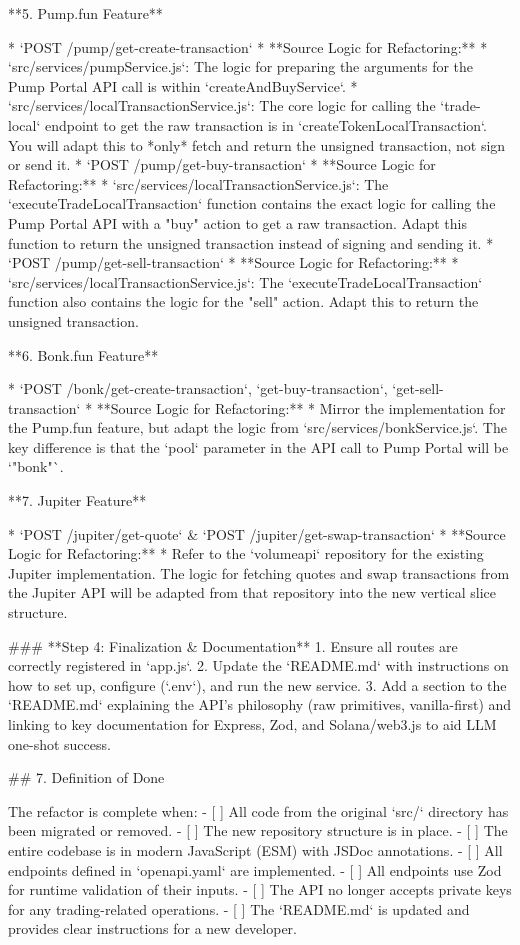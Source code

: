 **5. Pump.fun Feature**

*   `POST /pump/get-create-transaction`
    *   **Source Logic for Refactoring:**
        *   `src/services/pumpService.js`: The logic for preparing the arguments for the Pump Portal API call is within `createAndBuyService`.
        *   `src/services/localTransactionService.js`: The core logic for calling the `trade-local` endpoint to get the raw transaction is in `createTokenLocalTransaction`. You will adapt this to *only* fetch and return the unsigned transaction, not sign or send it.
*   `POST /pump/get-buy-transaction`
    *   **Source Logic for Refactoring:**
        *   `src/services/localTransactionService.js`: The `executeTradeLocalTransaction` function contains the exact logic for calling the Pump Portal API with a "buy" action to get a raw transaction. Adapt this function to return the unsigned transaction instead of signing and sending it.
*   `POST /pump/get-sell-transaction`
    *   **Source Logic for Refactoring:**
        *   `src/services/localTransactionService.js`: The `executeTradeLocalTransaction` function also contains the logic for the "sell" action. Adapt this to return the unsigned transaction.

**6. Bonk.fun Feature**

*   `POST /bonk/get-create-transaction`, `get-buy-transaction`, `get-sell-transaction`
    *   **Source Logic for Refactoring:**
        *   Mirror the implementation for the Pump.fun feature, but adapt the logic from `src/services/bonkService.js`. The key difference is that the `pool` parameter in the API call to Pump Portal will be `"bonk"`.

**7. Jupiter Feature**

*   `POST /jupiter/get-quote` & `POST /jupiter/get-swap-transaction`
    *   **Source Logic for Refactoring:**
        *   Refer to the `volumeapi` repository for the existing Jupiter implementation. The logic for fetching quotes and swap transactions from the Jupiter API will be adapted from that repository into the new vertical slice structure.


### **Step 4: Finalization & Documentation**
1.  Ensure all routes are correctly registered in `app.js`.
2.  Update the `README.md` with instructions on how to set up, configure (`.env`), and run the new service.
3.  Add a section to the `README.md` explaining the API's philosophy (raw primitives, vanilla-first) and linking to key documentation for Express, Zod, and Solana/web3.js to aid LLM one-shot success.

## 7. Definition of Done

The refactor is complete when:
-   [ ] All code from the original `src/` directory has been migrated or removed.
-   [ ] The new repository structure is in place.
-   [ ] The entire codebase is in modern JavaScript (ESM) with JSDoc annotations.
-   [ ] All endpoints defined in `openapi.yaml` are implemented.
-   [ ] All endpoints use Zod for runtime validation of their inputs.
-   [ ] The API no longer accepts private keys for any trading-related operations.
-   [ ] The `README.md` is updated and provides clear instructions for a new developer.